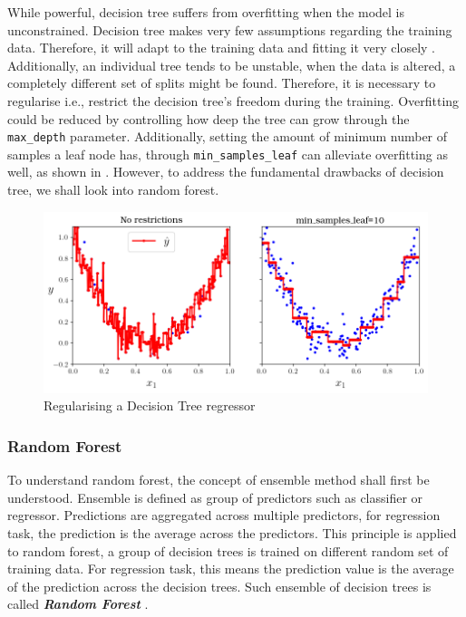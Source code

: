 While powerful, decision tree suffers from overfitting when the model is unconstrained. Decision tree makes very few assumptions regarding the training data. Therefore, it will adapt to the training data and fitting it very closely \cite{Geron.2019}. Additionally, an individual tree tends to be unstable, when the data is altered, a completely different set of splits might be found\cite{Hastie.2009,Kuhn.2013}. Therefore, it is necessary to regularise i.e., restrict the decision tree's freedom during the training. Overfitting could be reduced by controlling how deep the tree can grow through the {\tt max\_depth} parameter. Additionally, setting the amount of minimum number of samples a leaf node has, through {\tt min\_samples\_leaf} can alleviate overfitting as well, as shown in . However, to address the fundamental drawbacks of decision tree, we shall look into random forest.
\begin{figure}
    \centering
        \includegraphics[width=.9\textwidth]{02_figures/fig6_6_paramdepth_geron09.png}
        \caption{Regularising a Decision Tree regressor \cite{Geron.2019}}
        \label{fig:geron6_6}
\end{figure}

\subsubsection{Random Forest}\label{rf_theo}

To understand random forest, the concept of ensemble method shall first be understood. Ensemble is defined as group of predictors such as classifier or regressor. Predictions are aggregated across multiple predictors, for regression task, the prediction is the average across the predictors. This principle is applied to random forest, a group of decision trees is trained on different random set of training data. For regression task, this means the prediction value is the average of the prediction across the decision trees. Such ensemble of decision trees is called \emph{\textbf{Random Forest}} \cite{Hastie.2009,Breiman.2001,TinKamHo.1995}.\\

